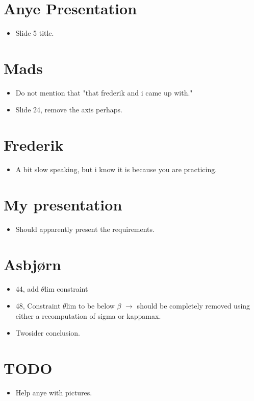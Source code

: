 \documentclass[a4paper]{article}
\begin{document}
\section{Anye Presentation}
\begin{itemize}
	\item Slide 5 title.
\end{itemize}

\section{Mads}
\begin{itemize}
	\item Do not mention that "that frederik and i came up with."
	\item Slide 24, remove the axis perhaps. 
\end{itemize}

\section{Frederik}
\begin{itemize}
	\item A bit slow speaking, but i know it is because you are practicing. 
\end{itemize}

\section{My presentation}
\begin{itemize}
	\item Should apparently present the requirements. 
\end{itemize}

\section{Asbjørn}
\begin{itemize}
	\item 44, add $\theta$lim constraint
	\item 48, Constraint $\theta$lim to be below $\beta$ $ \rightarrow $ should be completely removed using either a recomputation of sigma or kappamax. 
	\item Twosider conclusion. 
\end{itemize}


\section{TODO}
\begin{itemize}
	\item Help anye with pictures.
\end{itemize}
\end{document}
